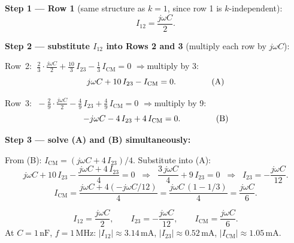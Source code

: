 \textbf{Step 1 — Row 1} (same structure as $k = 1$, since row 1 is
$k$-independent):
\[
    I_{12} = \frac{j\omega C}{2}.
\]

\textbf{Step 2 — substitute $I_{12}$ into Rows 2 and 3}
(multiply each row by $j\omega C$):

Row~2: $\;\tfrac{2}{3}\cdot\tfrac{j\omega C}{2}
        + \tfrac{10}{3}\,I_{23}
        - \tfrac{1}{3}\,I_{\mathrm{CM}} = 0$
\quad$\Rightarrow$\quad multiply by 3:
\[
    j\omega C + 10\,I_{23} - I_{\mathrm{CM}} = 0. \hspace{1.5cm}\text{(A)}
\]

Row~3: $\;-\tfrac{2}{9}\cdot\tfrac{j\omega C}{2}
          - \tfrac{4}{9}\,I_{23}
          + \tfrac{4}{9}\,I_{\mathrm{CM}} = 0$
\quad$\Rightarrow$\quad multiply by 9:
\[
    -j\omega C - 4\,I_{23} + 4\,I_{\mathrm{CM}} = 0. \hspace{1.5cm}\text{(B)}
\]

\textbf{Step 3 — solve (A) and (B) simultaneously:}

From (B): $I_{\mathrm{CM}} = (j\omega C + 4\,I_{23})/4$.
Substitute into (A):
\[
    j\omega C + 10\,I_{23} - \frac{j\omega C + 4\,I_{23}}{4} = 0
    \;\;\Rightarrow\;\;
    \frac{3\,j\omega C}{4} + 9\,I_{23} = 0
    \;\;\Rightarrow\;\;
    I_{23} = -\frac{j\omega C}{12}.
\]
\[
    I_{\mathrm{CM}}
    = \frac{j\omega C + 4(-j\omega C/12)}{4}
    = \frac{j\omega C\,(1 - 1/3)}{4}
    = \frac{j\omega C}{6}.
\]

\begin{eqnbox}[Final Results ($N = 3$, $k = 0.5$, $V_{12} = 1\,\text{V}$,
              $V_{23} = V_{\mathrm{CM}} = 0$)]
\[
    I_{12} = \frac{j\omega C}{2},
    \qquad
    I_{23} = -\frac{j\omega C}{12},
    \qquad
    I_{\mathrm{CM}} = \frac{j\omega C}{6}.
\]
At $C = 1\,\text{nF}$, $f = 1\,\text{MHz}$:\quad
$|I_{12}| \approx 3.14\,\text{mA}$,\;
$|I_{23}| \approx 0.52\,\text{mA}$,\;
$|I_{\mathrm{CM}}| \approx 1.05\,\text{mA}$.
\end{eqnbox}

